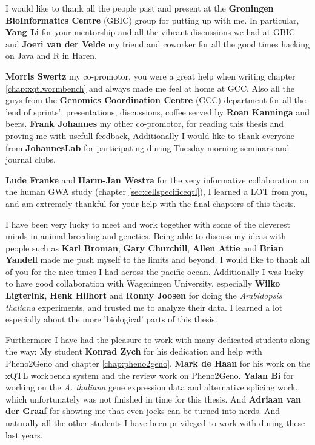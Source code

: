 I would like to thank all the people past and present at the {\bf Groningen BioInformatics Centre} 
(GBIC) group for putting up with me. In particular, {\bf Yang Li} for your mentorship and all the 
vibrant discussions we had at GBIC and {\bf Joeri van der Velde} my friend and coworker for all 
the good times hacking on Java and R in Haren. 

{\bf Morris Swertz} my co-promotor, you were a great help when writing chapter \ref{chap:xqtlwormbench} 
and always made me feel at home at GCC. Also all the guys from the {\bf Genomics Coordination 
Centre} (GCC) department for all the 'end of sprints', presentations, discussions, coffee served by {\bf Roan Kanninga} and beers. 
{\bf Frank Johannes} my other co-promotor, for reading this thesis and proving me with usefull feedback, 
Additionally I would like to thank everyone from {\bf JohannesLab} for participating during Tuesday morning 
seminars and journal clubs. 

{\bf Lude Franke} and {\bf Harm-Jan Westra} for the very informative collaboration on the 
human GWA study (chapter \ref{sec:cellspecificeqtl}), I learned a LOT from you, and am 
extremely thankful for your help with the final chapters of this thesis. 

I have been very lucky to meet and work together with some of the cleverest minds in animal breeding 
and genetics. Being able to discuss my ideas with people such as {\bf Karl Broman}, {\bf Gary Churchill}, 
{\bf Allen Attie} and {\bf Brian Yandell} made me push myself to the limits and beyond. I would like 
to thank all of you for the nice times I had across the pacific ocean. 
Additionally I was lucky to have good collaboration with Wageningen University, especially {\bf Wilko 
Ligterink}, {\bf Henk Hilhort} and {\bf Ronny Joosen} for doing the \emph{Arabidopsis thaliana} 
experiments, and trusted me to analyze their data. I learned a lot especially about the more 'biological' 
parts of this thesis. 

Furthermore I have had the pleasure to work with many dedicated students along the way: 
My student {\bf Konrad Zych} for his dedication and help with Pheno2Geno and chapter \ref{chap:pheno2geno}. 
{\bf Mark de Haan} for his work on the xQTL workbench system and the review work on Pheno2Geno.
{\bf Yalan Bi} for working on the \emph{A. thaliana} gene expression data and alternative splicing 
work, which unfortunately was not finished in time for this thesis. And {\bf Adriaan van der Graaf} for 
showing me that even jocks can be turned into nerds. And naturally all the other students I have been 
privileged to work with during these last years.

